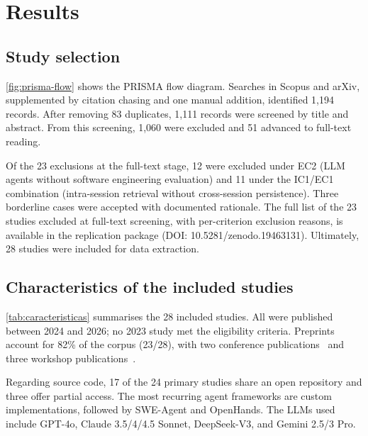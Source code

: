 \section{Results}
\label{sec:resultados}

\subsection{Study selection}
\label{sec:selecao-estudos}

\autoref{fig:prisma-flow} shows the PRISMA flow diagram.
Searches in Scopus and arXiv, supplemented by citation chasing and one
manual addition, identified 1,194 records.
After removing 83 duplicates, 1,111 records were screened by title and
abstract.
From this screening, 1,060 were excluded and 51 advanced to full-text
reading.

Of the 23 exclusions at the full-text stage, 12 were excluded under EC2
(LLM agents without software engineering evaluation) and 11 under the
IC1/EC1 combination (intra-session retrieval without cross-session
persistence).
Three borderline cases were accepted with documented rationale.
The full list of the 23 studies excluded at full-text screening, with
per-criterion exclusion reasons, is available in the replication package
(DOI: 10.5281/zenodo.19463131).
Ultimately, 28 studies were included for data extraction.



\FloatBarrier
\subsection{Characteristics of the included studies}
\label{sec:caracteristicas}

\autoref{tab:caracteristicas} summarises the 28 included studies.
All were published between 2024 and 2026; no 2023 study met the
eligibility criteria.
Preprints account for 82\% of the corpus (23/28), with two conference
publications~\citep{wang2026improving,zhang2025darwingodel} and three
workshop
publications~\citep{deshpande2025memtrack,shen2025talm,lindenbauer2025ctimrover}.

Regarding source code, 17 of the 24 primary studies share an open
repository and three offer partial access.
The most recurring agent frameworks are custom implementations, followed
by SWE-Agent and OpenHands.
The LLMs used include GPT-4o, Claude 3.5/4/4.5 Sonnet, DeepSeek-V3,
and Gemini 2.5/3 Pro.

